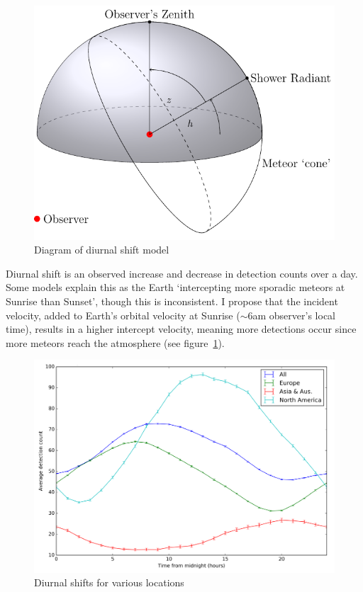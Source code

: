 \documentclass[landscape,a0paper,fontscale=0.400]{baposter} %
\begin{document}
\begin{poster}
{\begin{multicols}{2}
\begin{figure}
	\centering
	\includegraphics[width=\linewidth]{diagram}
	\caption{Diagram of diurnal shift model \label{fig:diagram}}
\end{figure}

Diurnal shift is an observed increase and decrease in detection counts over a day. Some models explain this as the Earth `intercepting more sporadic meteors at Sunrise than Sunset', though this is inconsistent. I propose that the incident velocity, added to Earth's orbital velocity at Sunrise ($\sim 6$am observer's local time), results in a higher intercept velocity, meaning more detections occur since more meteors reach the atmosphere (see figure~\ref{fig:diagram}).\\

\begin{figure}
	\centering
	\includegraphics[width=\linewidth]{all_shifts}
	\caption{Diurnal shifts for various locations
		\label{fig:shifts}}
\end{figure}


\end{multicols}}
\end{poster}
\end{document}
